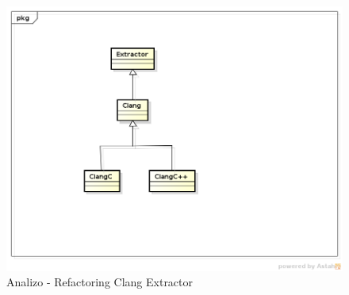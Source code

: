 \begin{frame}
\begin{figure}[!htb]
\centering
\includegraphics[scale=0.3]{SOLID_ANALIZO}
\caption{Analizo - Refactoring Clang Extractor}
\end{figure}
\end{frame}

